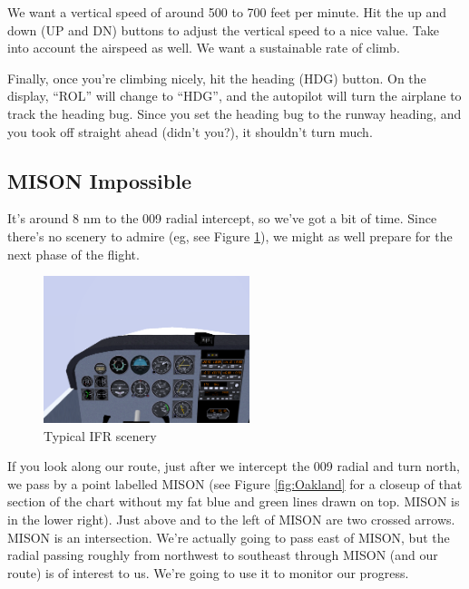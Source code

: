 We want a vertical speed of around 500 to 700 feet per minute.  Hit
the up and down (UP and DN) buttons to adjust the vertical speed to a
nice value.  Take into account the airspeed as well.  We want a
sustainable rate of climb.

Finally, once you're climbing nicely, hit the heading (HDG)
button.  On the display, ``ROL'' will change to ``HDG'',
and the autopilot will turn the airplane to track the heading bug.
Since you set the heading bug to the runway heading, and you took off
straight ahead (didn't you?), it shouldn't turn much.

\subsection{MISON Impossible}

It's around 8 nm to the 009 radial intercept, so we've got a bit of
time.  Since there's no scenery to admire (eg, see Figure
\ref{fig:murk}), we might as well prepare for the next phase of the
flight.

\begin{figure}
  \begin{center}
    \includegraphics[width=6cm]{img/murk}
    \caption{Typical IFR scenery}
    \label{fig:murk}
  \end{center}
\end{figure}

If you look along our route, just after we intercept the 009 radial
and turn north, we pass by a point labelled MISON (see Figure
\ref{fig:Oakland} for a closeup of that section of the chart without
my fat blue and green lines drawn on top.  MISON is in the lower
right).  Just above and to the left of MISON are two crossed arrows.
MISON is an intersection.  We're actually going to pass east of MISON,
but the radial passing roughly from northwest to southeast through
MISON (and our route) is of interest to us.  We're going to use it to
monitor our progress.

